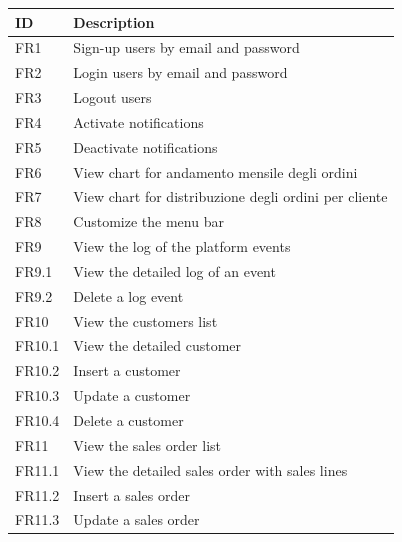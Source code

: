 \begin{table}
    \centering
    \begin{tabular}{|l|p{10cm}|}
        \hline
        ID     & Description                                           \\ \hline
        FR1    & Sign-up users by email and password                   \\ \hline
        FR2    & Login users by email and password                     \\ \hline
        FR3    & Logout users                                          \\ \hline
        FR4    & Activate notifications                                \\ \hline
        FR5    & Deactivate notifications                              \\ \hline
        FR6    & View chart for andamento mensile degli ordini         \\ \hline
        FR7    & View chart for distribuzione degli ordini per cliente \\ \hline
        FR8    & Customize the menu bar                                \\ \hline
        FR9    & View the log of the platform events                   \\ \hline
        FR9.1  & View the detailed log of an event                     \\ \hline
        FR9.2  & Delete a log event                                    \\ \hline
        FR10   & View the customers list                               \\ \hline
        FR10.1 & View the detailed customer                            \\ \hline
        FR10.2 & Insert a customer                                     \\ \hline
        FR10.3 & Update a customer                                     \\ \hline
        FR10.4 & Delete a customer                                     \\ \hline
        FR11   & View the sales order list                             \\ \hline
        FR11.1 & View the detailed sales order with sales lines        \\ \hline
        FR11.2 & Insert a sales order                                  \\ \hline
        FR11.3 & Update a sales order                                  \\ \hline

\end{tabular}
\end{table}
